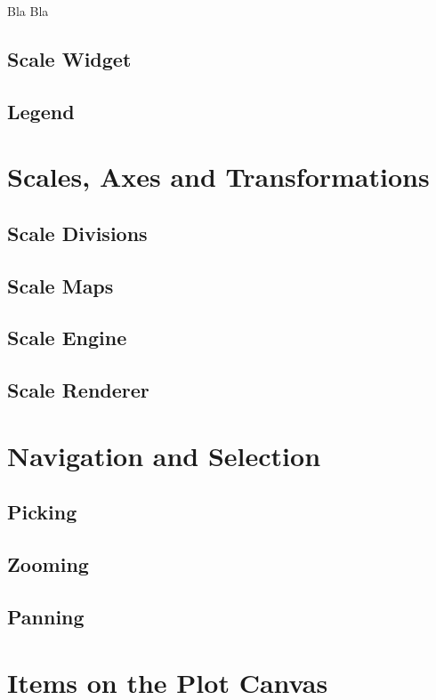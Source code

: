 \documentclass[12pt,a4paper]{book}
\begin{document}
Bla Bla

\section{Scale Widget}
\section{Legend}



\chapter{Scales, Axes and Transformations}

\section{Scale Divisions}

\section{Scale Maps}

\section{Scale Engine}

\section{Scale Renderer}

\chapter{Navigation and Selection}

\section{Picking}
\section{Zooming}
\section{Panning}

\chapter{Items on the Plot Canvas}
\end{document}
